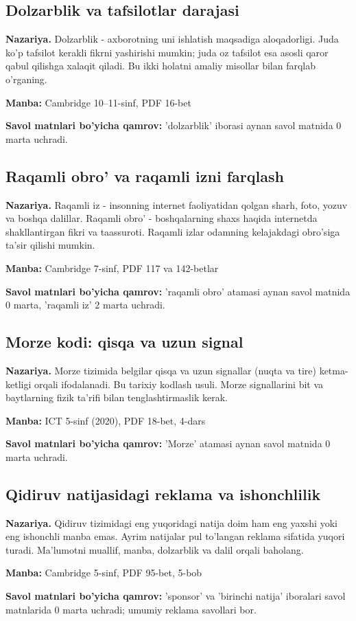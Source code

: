 \documentclass[10pt,a4paper,oneside]{article}
\begin{document}
\subsection{Dolzarblik va tafsilotlar darajasi}
\textbf{Nazariya.} Dolzarblik - axborotning uni ishlatish maqsadiga aloqadorligi. Juda ko'p tafsilot kerakli fikrni yashirishi mumkin; juda oz tafsilot esa asosli qaror qabul qilishga xalaqit qiladi. Bu ikki holatni amaliy misollar bilan farqlab o'rganing.
\par\textbf{Manba:} Cambridge 10--11-sinf, PDF 16-bet
\par\textbf{Savol matnlari bo'yicha qamrov:} 'dolzarblik' iborasi aynan savol matnida 0 marta uchradi.
\subsection{Raqamli obro' va raqamli izni farqlash}
\textbf{Nazariya.} Raqamli iz - insonning internet faoliyatidan qolgan sharh, foto, yozuv va boshqa dalillar. Raqamli obro' - boshqalarning shaxs haqida internetda shakllantirgan fikri va taassuroti. Raqamli izlar odamning kelajakdagi obro'siga ta'sir qilishi mumkin.
\par\textbf{Manba:} Cambridge 7-sinf, PDF 117 va 142-betlar
\par\textbf{Savol matnlari bo'yicha qamrov:} 'raqamli obro' atamasi aynan savol matnida 0 marta, 'raqamli iz' 2 marta uchradi.
\subsection{Morze kodi: qisqa va uzun signal}
\textbf{Nazariya.} Morze tizimida belgilar qisqa va uzun signallar (nuqta va tire) ketma-ketligi orqali ifodalanadi. Bu tarixiy kodlash usuli. Morze signallarini bit va baytlarning fizik ta'rifi bilan tenglashtirmaslik kerak.
\par\textbf{Manba:} ICT 5-sinf (2020), PDF 18-bet, 4-dars
\par\textbf{Savol matnlari bo'yicha qamrov:} 'Morze' atamasi aynan savol matnida 0 marta uchradi.
\subsection{Qidiruv natijasidagi reklama va ishonchlilik}
\textbf{Nazariya.} Qidiruv tizimidagi eng yuqoridagi natija doim ham eng yaxshi yoki eng ishonchli manba emas. Ayrim natijalar pul to'langan reklama sifatida yuqori turadi. Ma'lumotni muallif, manba, dolzarblik va dalil orqali baholang.
\par\textbf{Manba:} Cambridge 5-sinf, PDF 95-bet, 5-bob
\par\textbf{Savol matnlari bo'yicha qamrov:} 'sponsor' va 'birinchi natija' iboralari savol matnlarida 0 marta uchradi; umumiy reklama savollari bor.
\end{document}
